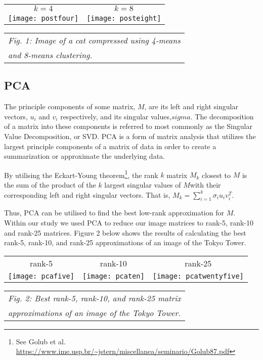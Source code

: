 \documentclass[letterpaper, 10 pt, conference]{ieeeconf}  %
\begin{document}
\vspace*{3mm}
\begin{tabular}{c c}
	$k=4$ & $k=8$ \\
	\texttt{[image: postfour]} &
		\texttt{[image: posteight]} \\
\end{tabular}
\begin{tabular}{l}
	{\it \hspace*{4mm} Fig. 1: Image of a cat compressed using 4-means} \\
	{\it \hspace*{4mm} and 8-means clustering.}
\end{tabular}

\subsection{PCA}
The principle components of some matrix, $M$, are its left and right singular vectors, $u_i$ and $v_i$ respectively, and its singular values,$sigma$. The decomposition of a matrix into these components is referred to most commonly as the Singular Value Decomposition, or SVD.
PCA is a form of matrix analysis that utilizes the largest principle components of a matrix of data in order to create a summarization or approximate the underlying data.

By utilising the Eckart-Young theorem\footnote{See Golub et al. \url{https://www.ime.usp.br/~jstern/miscellanea/seminario/Golub87.pdf}}, the rank $k$ matrix $M_k$ closest to $M$ is the sum of the product of the $k$ largest singular values of $M$with their corresponding left and right singular vectors. That is, $M_k = \sum_{i=1}^k \sigma_i u_i v_i^T$.

Thus, PCA can be utilised to find the best low-rank approximation for $M$.
Within our study we used PCA to reduce our image matrices to rank-5, rank-10
and rank-25 matrices. Figure 2 below shows the results of calculating the best rank-5, rank-10,
and rank-25 approximations of an image of the Tokyo Tower.

\vspace*{3mm}
\begin{tabular}{c c c}
	rank-5 & rank-10 & rank-25 \\
	\texttt{[image: pcafive]} &
		\texttt{[image: pcaten]} &
		\texttt{[image: pcatwentyfive]} \\
\end{tabular}
\begin{tabular}{l}
	{\it \hspace*{4mm} Fig. 2: Best rank-5, rank-10, and rank-25 matrix} \\
	{\it \hspace*{4mm} approximations of an image of the Tokyo Tower.} \\
\end{tabular}
\end{document}

